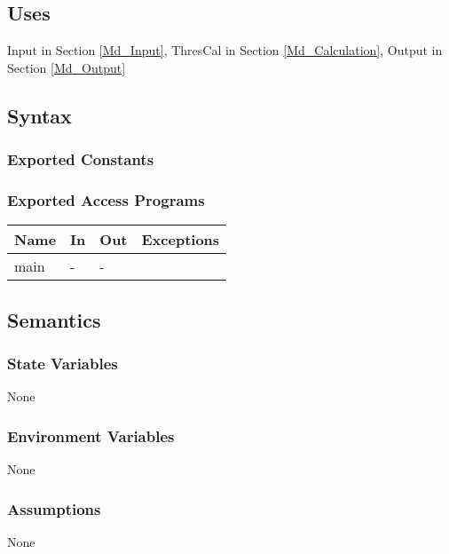 \documentclass[12pt, titlepage]{article}
\begin{document}
\subsection{Uses}

Input in Section \ref{Md_Input}, ThresCal in Section \ref{Md_Calculation},
Output in Section \ref{Md_Output}

\subsection{Syntax}

\subsubsection{Exported Constants}

\subsubsection{Exported Access Programs}

\begin{center}
\begin{tabular}{p{2cm} p{2cm} p{2cm} p{6cm}}
\hline
\textbf{Name} & \textbf{In} & \textbf{Out} & \textbf{Exceptions} \\
\hline
main & - & - & \\
\hline
\end{tabular}
\end{center}

\subsection{Semantics}

\subsubsection{State Variables}

None

\subsubsection{Environment Variables}

None

\subsubsection{Assumptions}

None
\end{document}
